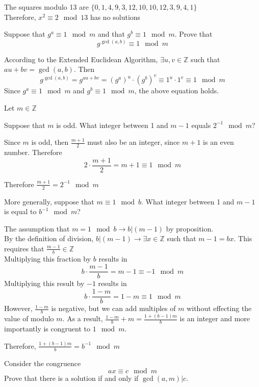 \documentclass[12pt]{article}
\begin{document}
    \solution
    The squares modulo 13 are $\{0,1,4,9,3,12,10,10,12,3,9,4,1\}$\\
    Therefore, $x^2\equiv 2\mod 13$ has no solutions

    \problem Suppose that $g^a\equiv 1\mod m$ and that $g^b\equiv 1\mod m$. Prove that
    \[g^{\gcd(a,b)}\equiv 1\mod m\]

    \solution
    According to the Extended Euclidean Algorithm, $\exists u,v\in\mathbb{Z}$ such that $au+bv=\gcd(a,b)$. Then
    \[g^{\gcd(a,b)}=g^{au+bv}=(g^a)^u\cdot(g^b)^v\equiv1^u\cdot1^v\equiv 1\mod{m}\]
    Since $g^a\equiv1\mod{m}$ and $g^b\equiv1\mod{m}$, the above equation holds.

    \newpage
    \problem Let $m\in\mathbb{Z}$
    
    \subproblem Suppose that $m$ is odd. What integer between 1 and $m-1$ equals $2^{-1}\mod{m}$?

    \solution
    Since $m$ is odd, then $\frac{m+1}{2}$ must also be an integer, since $m+1$ is an even number. Therefore
    \[2\cdot\frac{m+1}{2}=m+1\equiv1\mod{m}\]

    \noindent
    Therefore $\frac{m+1}{2}=2^{-1}\mod{m}$
    
    \subproblem More generally, suppose that $m\equiv 1\mod b$. What integer between 1 and $m-1$ is equal to $b^{-1}\mod m$?

    \solution
    The assumption that $m=1\mod{b}\rightarrow b|(m-1)$ by proposition.\\
    By the definition of division, $b|(m-1)\rightarrow\exists x\in\mathbb{Z}$ such that $m-1=bx$. This requires that $\frac{m-1}{b}\in\mathbb{Z}$\\
    Multiplying this fraction by $b$ results in
    \[b\cdot\frac{m-1}{b}=m-1\equiv-1\mod{m}\]
    Multiplying this result by $-1$ results in
    \[b\cdot\frac{1-m}{b}=1-m\equiv1\mod{m}\]
    However, $\frac{1-m}{b}$ is negative, but we can add multiples of $m$ without effecting the value of modulo $m$. As a result, $\frac{1-m}{b}+m=\frac{1+(b-1)m}{b}$ is an integer and more importantly is congruent to $1\mod{m}$.

    \noindent
    Therefore, $\frac{1+(b-1)m}{b}=b^{-1}\mod{m}$

    \newpage
    \problem Consider the congruence
    \[
    ax\equiv c\mod m
    \]
    Prove that there is a solution if and only if $\gcd(a,m)|c$.
\end{document}
